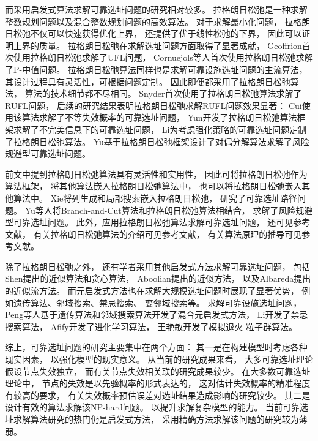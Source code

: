 而采用启发式算法求解可靠选址问题的研究相对较多。
拉格朗日松弛是一种求解整数规划问题以及混合整数规划问题的高效算法\cite{孙小玲,Hearn2009}。
对于求解最小化问题，
拉格朗日松弛不仅可以快速获得优化上界，
还提供了优于线性松弛的下界，
因此可以证明上界的质量。
拉格朗日松弛在求解选址问题方面取得了显著成就，
Geoffrion\cite{Geoffrion1974}首次使用拉格朗日松弛求解了UFL问题，
Cornuejols等人\cite{Cornuejols}首次使用拉格朗日松弛求解了P-中值问题。
拉格朗日松弛算法同样也是求解可靠设施选址问题的主流算法，
其设计过程具有灵活性，可根据问题定制。
因此即便都采用了拉格朗日松弛算法，
算法的技术细节都不尽相同。
Snyder\cite{Snyder2005}首次使用了拉格朗日松弛算法求解了RUFL问题，
后续的研究结果表明拉格朗日松弛求解RUFL问题效果显著：
Cui\cite{Cui2010}使用该算法求解了不等失效概率的可靠选址问题，
Yun\cite{yun2015}开发了拉格朗日松弛算法框架求解了不完美信息下的可靠选址问题，
Li\cite{qingwei}为考虑强化策略的可靠选址问题定制了拉格朗日松弛算法。
Yu\cite{risk_averse2}基于拉格朗日松弛框架设计了对偶分解算法求解了风险规避型可靠选址问题。

前文中提到拉格朗日松弛算法具有灵活性和实用性，
因此可将拉格朗日松弛作为算法框架，
将其他算法嵌入拉格朗日松弛算法中，
也可以将拉格朗日松弛嵌入其他算法中。
Xie\cite{xie}将列生成和局部搜索嵌入拉格朗日松弛，
研究了可靠选址路径问题。
Yu等人\cite{risk_averse1}将Branch-and-Cut算法和拉格朗日松弛算法相结合，
求解了风险规避型可靠选址问题。
此外，应用拉格朗日松弛算法求解可靠选址问题，
还可见参考文献\cite{YUN2020,qingwei2, wangjiguang}，
有关拉格朗日松弛算法的介绍可见参考文献\cite{孙小玲}，
有关算法原理的推导可见参考文献\cite{Fisher2004,Hearn2009}。

除了拉格朗日松弛之外，
还有学者采用其他启发式方法求解可靠选址问题，
包括Shen\cite{Shen2011}提出的近似算法和贪心算法，
Aboolian\cite{Aboolian}提出的近似方法，
以及Albareda\cite{rpmp}提出的近似流方法。
而元启发式方法也在求解大规模选址问题时展现了显著优势，
例如遗传算法\cite{Rahmani}、邻域搜索\cite{rainns}、禁忌搜索\cite{ts}、
变邻域搜索\cite{vns_ts}等。
求解可靠设施选址问题，
Peng等人\cite{peng}基于遗传算法和邻域搜索算法开发了混合元启发式方法，
Li\cite{qingwei3}开发了禁忌搜索算法，
Afify\cite{Afify}开发了进化学习算法，
王艳敏\cite{王艳敏}开发了模拟退火-粒子群算法。

综上，可靠选址问题的研究主要集中在两个方面：
其一是在构建模型时考虑各种现实因素，
以强化模型的现实意义。
从当前的研究成果来看，
大多可靠选址理论假设节点失效独立，
而有关节点失效相关联的研究成果较少。
在大多数可靠选址理论中，
节点的失效是以先验概率的形式表达的，
这对估计失效概率的精准程度有较高的要求，
有关失效概率预估误差对选址结果造成影响的研究较少。
其二是设计有效的算法求解该NP-hard问题。
以提升求解复杂模型的能力。
当前可靠选址求解算法研究的热门仍是启发式方法，
采用精确方法求解该问题的研究较为薄弱。


